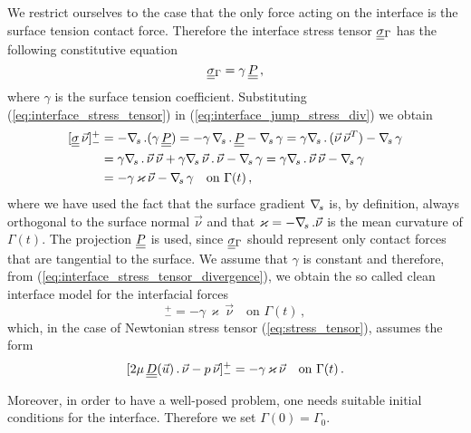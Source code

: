 We restrict ourselves to the case that the only force acting on the interface
is the surface tension contact force. Therefore the interface stress tensor
$\mat\sigma_\Gamma$ has the following constitutive equation
\begin{equation}\label{eq:interface_stress_tensor}
\mat\sigma_{\Gamma}=\gamma\,\mat P\,,
\end{equation}
where $\gamma$ is the surface tension coefficient. Substituting
(\ref{eq:interface_stress_tensor}) in (\ref{eq:interface_jump_stress_div}) we
obtain
\begin{equation}\label{eq:interface_stress_tensor_divergence}
\begin{align*}
[\mat\sigma\,\vec \nu]_-^+ &= -\nabs\,.(\gamma\,\mat P)
= -\gamma\,\nabs\,.\,\mat P-\nabs\,\gamma
= \gamma\nabs\,.\,(\vec\nu\,\vec\nu^T)-\nabs\,\gamma \\
& = \gamma\nabs\,.\,\vec\nu\,\vec\nu + \gamma\nabs\,\vec\nu\,.\,\vec\nu
- \nabs\,\gamma = \gamma\nabs\,.\,\vec\nu\,\vec\nu - \nabs\,\gamma \\
& = -\gamma\,\varkappa\,\vec\nu - \nabs\,\gamma \quad \mbox{on } \Gamma(t)\,,
\end{align*}
\end{equation}
where we have used the fact that the surface gradient $\nabla_{\!s}$ is, by definition,
always orthogonal to the surface normal $\vec\nu$ and that $\varkappa =
-\nabla_{\!s}\,.\vec\nu$ is the mean curvature of $\Gamma(t)$. The projection $\mat P$
is used, since $\mat\sigma_{\Gamma}$ should represent only contact forces that
are tangential to the surface. We assume that $\gamma$ is constant and
therefore, from (\ref{eq:interface_stress_tensor_divergence}), we obtain the
so called clean interface model for the interfacial forces
\begin{equation}
[\mat\sigma\,\vec \nu]_-^+ = -\gamma\,\varkappa\,\vec\nu \quad \mbox{on }
\Gamma(t)\,,
\end{equation}
which, in the case of Newtonian stress tensor (\ref{eq:stress_tensor}), assumes
the form
\begin{equation}\label{eq:interface_jump_stress}
[2\mu \,\mat D(\vec u)\,.\,\vec\nu - p\,\vec \nu]_-^+
= -\gamma\,\varkappa\,\vec\nu \quad \mbox{on } \Gamma(t)\,.
\end{equation}

Moreover, in order to have a well-posed problem, one needs suitable initial
conditions for the interface. Therefore we set $\Gamma(0)=\Gamma_0$.

